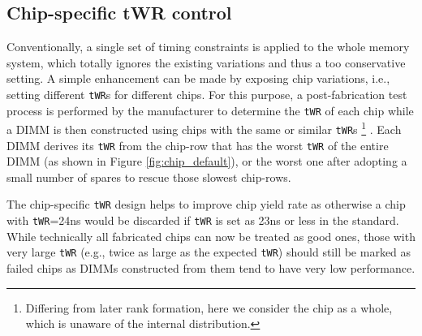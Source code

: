 \subsection{Chip-specific tWR control}
Conventionally, a single set of timing constraints is applied to the whole memory system, which totally ignores the existing variations and thus a too conservative setting.
A simple enhancement can be made by exposing chip variations, i.e., setting different {\tt tWR}s for different chips. 
For this purpose, a post-fabrication test process is performed by the manufacturer to determine the {\tt tWR} of each chip while a DIMM is then constructed using chips with the same or similar {\tt tWR}s
\footnote {Differing from later rank formation, here we consider the chip as a whole, which is unaware of the internal distribution.}
. Each DIMM derives its {\tt tWR} from the chip-row 
that has the worst {\tt tWR} of the entire DIMM (as shown in Figure \ref{fig:chip_default}), or the worst one after adopting a small number of spares to rescue those slowest chip-rows. 

The chip-specific {\tt tWR} design helps to improve chip yield rate as otherwise a chip with {\tt tWR}=24ns would be discarded if {\tt tWR} is set as 23ns or less in the standard.  While technically all fabricated chips can now be treated as good ones, those with very large {\tt tWR} (e.g., twice as large as the expected {\tt tWR}) should still be marked as failed chips as DIMMs constructed from them tend to have very low performance. 

